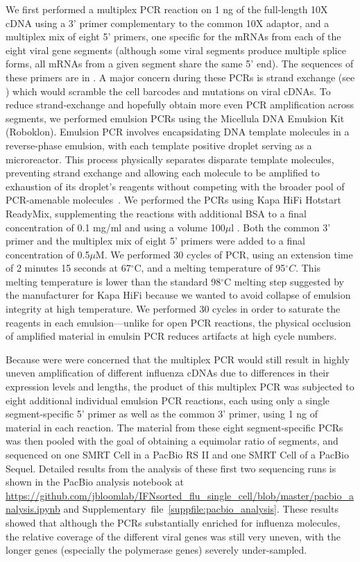 \documentclass[9pt,lineno]{elife}
\begin{document}
We first performed a multiplex PCR reaction on 1 ng of the full-length 10X cDNA using a 3' primer complementary to the common 10X adaptor, and a multiplex mix of eight 5' primers, one specific for the mRNAs from each of the eight viral gene segments (although some viral segments produce multiple splice forms, all mRNAs from a given segment share the same 5' end).
The sequences of these primers are in .
A major concern during these PCRs is strand exchange (see ) which would scramble the cell barcodes and mutations on viral cDNAs.
To reduce strand-exchange and hopefully obtain more even PCR amplification across segments, we performed emulsion PCRs using the Micellula DNA Emulsion Kit (Roboklon).
Emulsion PCR involves encapsidating DNA template molecules in a reverse-phase emulsion, with each template positive droplet serving as a microreactor.
This process physically separates disparate template molecules, preventing strand exchange and allowing each molecule to be amplified to exhaustion of its droplet's reagents without competing with the broader pool of PCR-amenable molecules~\citep{Boers:2015emulsion}.
We performed the PCRs using Kapa HiFi Hotstart ReadyMix, supplementing the reactions with additional BSA to a final concentration of 0.1 mg/ml and using a volume 100$\mu$l .
Both the common 3' primer and the multiplex mix of eight 5' primers were added to a final concentration of 0.5$\mu$M.
We performed 30 cycles of PCR, using an extension time of 2 minutes 15 seconds at 67$^{\circ}$C, and a melting temperature of 95$^{\circ}C$.
This melting temperature is lower than the standard 98$^{\circ}$C melting step suggested by the manufacturer for Kapa HiFi because we wanted to avoid collapse of emulsion integrity at high temperature.
We performed 30 cycles in order to saturate the reagents in each emulsion---unlike for open PCR reactions, the physical occlusion of amplified material in emulsin PCR reduces artifacts at high cycle numbers.

Because were were concerned that the multiplex PCR would still result in highly uneven amplification of different influenza cDNAs due to differences in their expression levels and lengths, the product of this multiplex PCR was subjected to eight additional individual emulsion PCR reactions, each using only a single segment-specific 5' primer as well as the common 3' primer, using 1 ng of material in each reaction.
The material from these eight segment-specific PCRs was then pooled with the goal of obtaining a equimolar ratio of segments, and sequenced on one SMRT Cell in a PacBio RS II and one SMRT Cell of a PacBio Sequel. 
Detailed results from the analysis of these first two sequencing runs is shown in the PacBio analysis notebook at \url{https://github.com/jbloomlab/IFNsorted_flu_single_cell/blob/master/pacbio_analysis.ipynb} and Supplementary~file~\ref{suppfile:pacbio_analysis}.
These results showed that although the PCRs substantially enriched for influenza molecules, the relative coverage of the different viral genes was still very uneven, with the longer genes (especially the polymerase genes) severely under-sampled.
\end{document}
